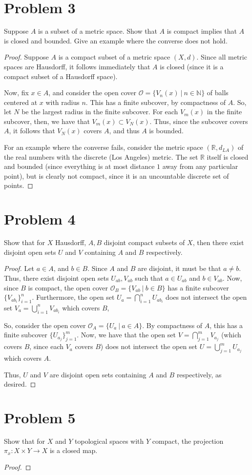 \documentclass[fontsize=11pt]{scrartcl} %
\numberwithin{equation}{section} %
\numberwithin{figure}{section} %
\numberwithin{table}{section} %
\newcommand{\R}{\mathbb{R}}
\newcommand{\N}{\mathbb{N}}
\begin{document}
\section*{Problem 3}
Suppose $A$ is a subset of a metric space. Show that $A$ is compact implies that
$A$ is closed and bounded. Give an example where the converse does not hold.
\\
\begin{proof}
    Suppose $A$ is a compact subset of a metric space $(X,d)$. Since all metric
    spaces are Hausdorff, it follows immediately that $A$ is closed (since it is
    a compact subset of a Hausdorff space).

    Now, fix $x\in A$, and consider the open cover $\mathscr{O} = \{V_n(x)\ |\
    n\in\N\}$ of balls centered at $x$ with radius $n$. This has a finite
    subcover, by compactness of $A$. So, let $N$ be the largest radius in the
    finite subcover. For each $V_m(x)$ in the finite subcover, then, we have
    that $V_m(x)\subset V_N(x)$. Thus, since the subcover covers $A$, it follows
    that $V_N(x)$ covers $A$, and thus $A$ is bounded.

    For an example where the converse fails, consider the metric space
    $(\R,d_{LA})$ of the real numbers with the discrete (Los Angeles) metric.
    The set $\R$ itself is closed and bounded (since everything is at most
    distance $1$ away from any particular point), but is clearly not compact,
    since it is an uncountable discrete set of points.
\end{proof}

\section*{Problem 4}
Show that for $X$ Hausdorff, $A,B$ disjoint compact subsets of $X$, then there
exist disjoint open sets $U$ and $V$ containing $A$ and $B$ respectively.
\\
\begin{proof}
Let $a\in A$, and $b\in B$. Since $A$ and $B$ are disjoint, it must be that
    $a\neq b$. Thus, there exist disjoint open sets $U_{ab},V_{ab}$ such that $a\in
    U_{ab}$ and $b\in V_{ab}$. Now, since $B$ is compact, the open cover
    $\mathscr{O}_B = \{V_{ab}\ |\ b\in B\}$ has a finite subcover
    $\{V_{ab_i}\}_{i=1}^n$. Furthermore, the open set $U_a =
    \bigcap_{i=1}^nU_{ab_i}$ does not intersect the open set $V_a =
    \bigcup_{i=1}^nV_{ab_i}$ which covers $B$,

    So, consider the open cover $\mathscr{O}_A = \{U_a\ |\ a\in A\}$. By
    compactness of $A$, this has a finite subcover $\{U_{a_j}\}_{j=1}^m$. Now,
    we have that the open set $V = \bigcap_{j=1}^mV_{a_j}$ (which covers $B$, since
    each $V_a$ covers $B$) does not intersect the open set $U =
    \bigcup_{j=1}^mU_{a_j}$ which covers $A$.

    Thus, $U$ and $V$ are disjoint open sets containing $A$ and $B$
    respectively, as desired.
\end{proof}

\section*{Problem 5}
Show that for $X$ and $Y$ topological spaces with $Y$ compact, the projection
$\pi_x:X\times Y\to X$ is a closed map.
\\
\begin{proof}

\end{proof}
\end{document}

